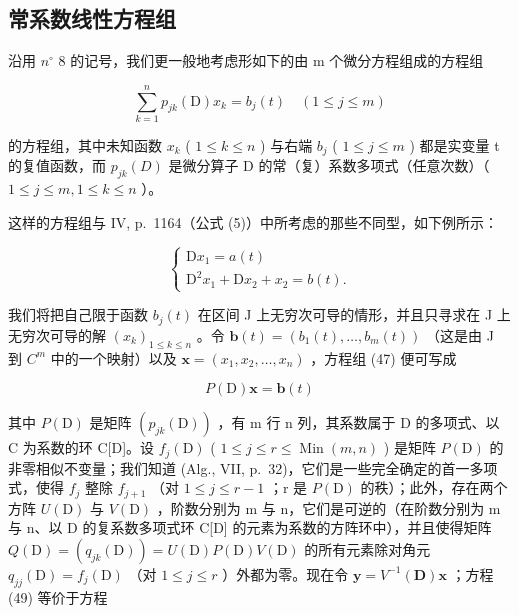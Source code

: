 \subsection{常系数线性方程组}

沿用 \(n^{\circ}\) 8 的记号，我们更一般地考虑形如下的由 m 个微分方程组成的方程组

\[
\sum_ {k = 1} ^ {n} p _ {j k} (\mathrm{D}) x _ {k} = b _ {j} (t) \quad (1 \leqslant j \leqslant m)\tag{47}
\]

的方程组，其中未知函数 \(x_{k}\) ( \(1 \leqslant k \leqslant n\) ) 与右端 \(b_{j}\) ( \(1 \leqslant j \leqslant m\) ) 都是实变量 t 的复值函数，而 \(p_{jk}(D)\) 是微分算子 D 的常（复）系数多项式（任意次数）（ \(1 \leqslant j \leqslant m, 1 \leqslant k \leqslant n\) ）。

这样的方程组与 IV, p.~1164（公式 (5)）中所考虑的那些不同型，如下例所示：

\[
\left\{ \begin{array}{c} \mathrm{D} x _ {1} = a (t) \\ \mathrm{D} ^ {2} x _ {1} + \mathrm{D} x _ {2} + x _ {2} = b (t). \end{array} \right.\tag{48}
\]

我们将把自己限于函数 \(b_{j}(t)\) 在区间 J 上无穷次可导的情形，并且只寻求在 J 上无穷次可导的解 \((x_{k})_{1\leqslant k\leqslant n}\) 。令 \(\mathbf{b}(t)=\left(b_{1}(t),\ldots,b_{m}(t)\right)\) （这是由 J 到 \(C^{m}\) 中的一个映射）以及 \(\mathbf{x}=\left(x_{1},x_{2},\ldots,x_{n}\right)\) ，方程组 (47) 便可写成

\[
P (\mathrm{D}) \mathbf {x} = \mathbf {b} (t)\tag{49}
\]

其中 \(P(\mathrm{D})\) 是矩阵 \((p_{jk}(\mathrm{D}))\) ，有 m 行 n 列，其系数属于 D 的多项式、以 C 为系数的环 C{[}D{]}。设 \(f_{j}(\mathrm{D})\) ( \(1 \leqslant j \leqslant r \leqslant \operatorname{Min}(m, n)\) ) 是矩阵 \(P(\mathrm{D})\) 的非零相似不变量；我们知道 (Alg., VII, p.~32)，它们是一些完全确定的首一多项式，使得 \(f_{j}\) 整除 \(f_{j+1}\) （对 \(1 \leqslant j \leqslant r - 1\) ；r 是 \(P(\mathrm{D})\) 的秩）；此外，存在两个方阵 \(U(\mathrm{D})\) 与 \(V(\mathrm{D})\) ，阶数分别为 m 与 n，它们是可逆的（在阶数分别为 m 与 n、以 D 的复系数多项式环 C{[}D{]} 的元素为系数的方阵环中），并且使得矩阵 \(Q(\mathrm{D}) = (q_{jk}(\mathrm{D})) = U(\mathrm{D}) P(\mathrm{D}) V(\mathrm{D})\) 的所有元素除对角元 \(q_{jj}(\mathrm{D}) = f_{j}(\mathrm{D})\) （对 \(1 \leqslant j \leqslant r\) ）外都为零。现在令 \(\mathbf{y} = V^{-1}(\mathbf{D})\mathbf{x}\) ；方程 (49) 等价于方程

